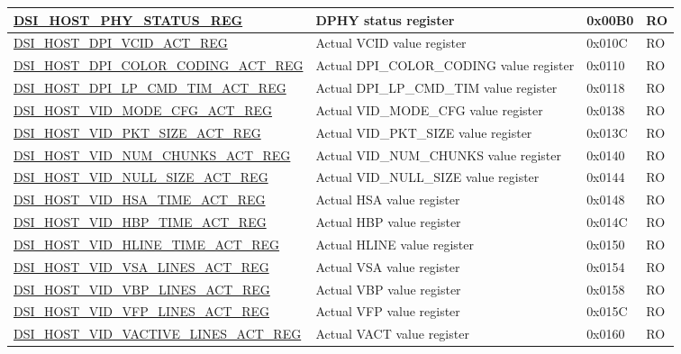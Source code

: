 \begin{longtable}{ | p{6.8cm} | p{7.2cm} | p{1.3cm} | p{1cm} | }
\hyperref[regdesc:DSIHOSTPHYSTATUSREG]{DSI\_HOST\_PHY\_STATUS\_REG} & DPHY status register & 0x00B0 & RO \\ \hline
\hyperref[regdesc:DSIHOSTDPIVCIDACTREG]{DSI\_HOST\_DPI\_VCID\_ACT\_REG} & Actual VCID value register & 0x010C & RO \\ \hline
\hyperref[regdesc:DSIHOSTDPICOLORCODINGACTREG]{DSI\_HOST\_DPI\_COLOR\_CODING\_ACT\_REG} & Actual DPI\_COLOR\_CODING value register & 0x0110 & RO \\ \hline
\hyperref[regdesc:DSIHOSTDPILPCMDTIMACTREG]{DSI\_HOST\_DPI\_LP\_CMD\_TIM\_ACT\_REG} & Actual DPI\_LP\_CMD\_TIM value register & 0x0118 & RO \\ \hline
\hyperref[regdesc:DSIHOSTVIDMODECFGACTREG]{DSI\_HOST\_VID\_MODE\_CFG\_ACT\_REG} & Actual VID\_MODE\_CFG value register & 0x0138 & RO \\ \hline
\hyperref[regdesc:DSIHOSTVIDPKTSIZEACTREG]{DSI\_HOST\_VID\_PKT\_SIZE\_ACT\_REG} & Actual VID\_PKT\_SIZE value register & 0x013C & RO \\ \hline
\hyperref[regdesc:DSIHOSTVIDNUMCHUNKSACTREG]{DSI\_HOST\_VID\_NUM\_CHUNKS\_ACT\_REG} & Actual VID\_NUM\_CHUNKS value register & 0x0140 & RO \\ \hline
\hyperref[regdesc:DSIHOSTVIDNULLSIZEACTREG]{DSI\_HOST\_VID\_NULL\_SIZE\_ACT\_REG} & Actual VID\_NULL\_SIZE value register & 0x0144 & RO \\ \hline
\hyperref[regdesc:DSIHOSTVIDHSATIMEACTREG]{DSI\_HOST\_VID\_HSA\_TIME\_ACT\_REG} & Actual HSA value register & 0x0148 & RO \\ \hline
\hyperref[regdesc:DSIHOSTVIDHBPTIMEACTREG]{DSI\_HOST\_VID\_HBP\_TIME\_ACT\_REG} & Actual HBP value register & 0x014C & RO \\ \hline
\hyperref[regdesc:DSIHOSTVIDHLINETIMEACTREG]{DSI\_HOST\_VID\_HLINE\_TIME\_ACT\_REG} & Actual HLINE value register & 0x0150 & RO \\ \hline
\hyperref[regdesc:DSIHOSTVIDVSALINESACTREG]{DSI\_HOST\_VID\_VSA\_LINES\_ACT\_REG} & Actual VSA value register & 0x0154 & RO \\ \hline
\hyperref[regdesc:DSIHOSTVIDVBPLINESACTREG]{DSI\_HOST\_VID\_VBP\_LINES\_ACT\_REG} & Actual VBP value register & 0x0158 & RO \\ \hline
\hyperref[regdesc:DSIHOSTVIDVFPLINESACTREG]{DSI\_HOST\_VID\_VFP\_LINES\_ACT\_REG} & Actual VFP value register & 0x015C & RO \\ \hline
\hyperref[regdesc:DSIHOSTVIDVACTIVELINESACTREG]{DSI\_HOST\_VID\_VACTIVE\_LINES\_ACT\_REG} & Actual VACT value register & 0x0160 & RO \\ \hline

\end{longtable}
